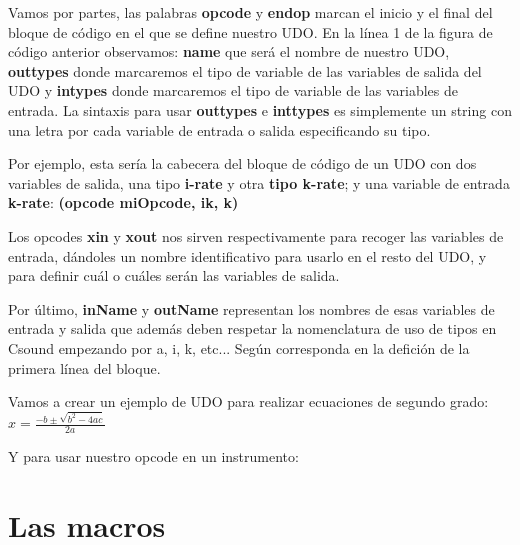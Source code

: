 
Vamos por partes, las palabras \textbf{opcode} y \textbf{endop} marcan el inicio y el final del bloque de código en el que se define nuestro UDO. En la línea 1 de la figura de código anterior observamos: \textbf{name} que será el nombre de nuestro UDO, \textbf{outtypes} donde marcaremos el tipo de variable de las variables de salida del UDO y \textbf{intypes} donde marcaremos el tipo de variable de las variables de entrada. La sintaxis para usar \textbf{outtypes} e \textbf{inttypes} es simplemente un string con una letra por cada variable de entrada o salida especificando su tipo.

Por ejemplo, esta sería la cabecera del bloque de código de un UDO con dos variables de salida, una tipo \textbf{i-rate} y otra \textbf{tipo k-rate}; y una variable de entrada \textbf{k-rate}: \textbf{(opcode miOpcode, ik, k)}

Los opcodes \textbf{xin} y \textbf{xout} nos sirven respectivamente para recoger las variables de entrada, dándoles un nombre identificativo para usarlo en el resto del UDO, y para definir cuál o cuáles serán las variables de salida.

Por último, \textbf{inName} y \textbf{outName} representan los nombres de esas variables de entrada y salida que además deben respetar la nomenclatura de uso de tipos en Csound empezando por a, i, k, etc... Según corresponda en la defición de la primera línea del bloque.

Vamos a crear un ejemplo de UDO para realizar ecuaciones de segundo grado: \( x = \frac {-b \pm \sqrt {b^2 - 4ac}}{2a} \)


Y para usar nuestro opcode en un instrumento:


\pagebreak


\section{Las macros}
